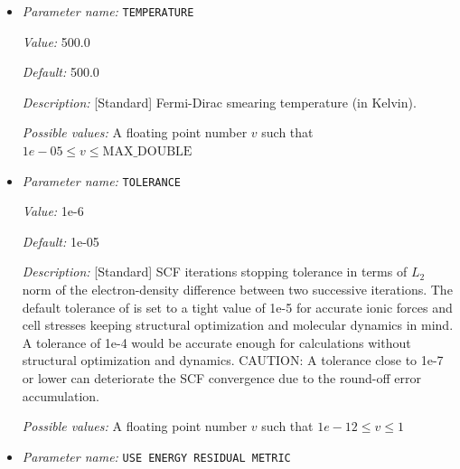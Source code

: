 \begin{itemize}
{\it Value:} RANDOM


{\it Default:} RANDOM


{\it Description:} [Standard] Sets the type of the starting Kohn-Sham wavefunctions guess: Atomic(Superposition of single atom atomic orbitals. Atom types for which atomic orbitals are not available, random wavefunctions are taken. Currently, atomic orbitals data is not available for all atoms.), Random(The starting guess for all wavefunctions are taken to be random). Default: RANDOM.


{\it Possible values:} Any one of ATOMIC, RANDOM
\item {\it Parameter name:} {\tt TEMPERATURE}
\label{parameters:SCF parameters/TEMPERATURE}
\label{parameters:SCF_20parameters/TEMPERATURE}


{\it Value:} 500.0


{\it Default:} 500.0


{\it Description:} [Standard] Fermi-Dirac smearing temperature (in Kelvin).


{\it Possible values:} A floating point number $v$ such that $1e-05 \leq v \leq \text{MAX\_DOUBLE}$
\item {\it Parameter name:} {\tt TOLERANCE}
\label{parameters:SCF parameters/TOLERANCE}
\label{parameters:SCF_20parameters/TOLERANCE}


{\it Value:} 1e-6


{\it Default:} 1e-05


{\it Description:} [Standard] SCF iterations stopping tolerance in terms of $L_2$ norm of the electron-density difference between two successive iterations. The default tolerance of is set to a tight value of 1e-5 for accurate ionic forces and cell stresses keeping structural optimization and molecular dynamics in mind. A tolerance of 1e-4 would be accurate enough for calculations without structural optimization and dynamics. CAUTION: A tolerance close to 1e-7 or lower can deteriorate the SCF convergence due to the round-off error accumulation.


{\it Possible values:} A floating point number $v$ such that $1e-12 \leq v \leq 1$
\item {\it Parameter name:} {\tt USE ENERGY RESIDUAL METRIC}
\label{parameters:SCF parameters/USE ENERGY RESIDUAL METRIC}
\label{parameters:SCF_20parameters/USE_20ENERGY_20RESIDUAL_20METRIC}



\end{itemize}
